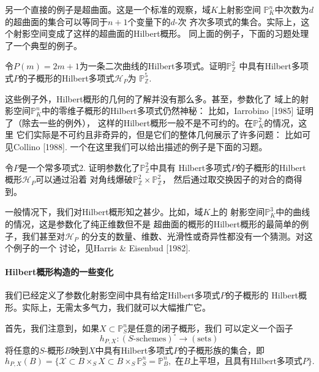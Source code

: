 另一个直接的例子是超曲面。这是一个标准的观察，域$K$上射影空间
$\mathbb P_K^n$中次数为$d$的超曲面的集合可以等同于$n+1$个变量下的$d$-次
齐次多项式的集合。实际上，这个射影空间变成了这样的超曲面的Hilbert概形。
同上面的例子，下面的习题处理了一个典型的例子。


\begin{exe}\label{exe:6.24}
令$P(m)=2m+1$为一条二次曲线的Hilbert多项式。证明$\mathbb P_{\mathbb Z}^2$
中具有Hilbert多项式$P$的子概形的Hilbert多项式$\mathscr H_P$为
$\mathbb P_{\mathbb Z}^5$.
\end{exe}

这些例子外，Hilbert概形的几何的了解并没有那么多。甚至，参数化了
域上的射影空间$\mathbb P_K^n$中的零维子概形的Hilbert多项式仍然神秘：
比如，Iarrobino [1985] 证明了（除去一些\naive 的例外），
这样的Hilbert概形一般不是不可约的。在$\mathbb P_K^2$的情况，这里
它们实际是不可约且非奇异的，但是它们的整体几何展示了许多问题：
比如可见Collino [1988]. 一个在这里我们可以给出描述的例子是下面的习题。

\begin{exe}\label{exe:6.25}
令$P$是一个常多项式$2$. 证明参数化了$\mathbb P_{\mathbb Z}^2$中具有
Hilbert多项式$P$的子概形的Hilbert概形$\mathscr H_P$可以通过沿着
对角线爆破$\mathbb P_{\mathbb Z}^2\times \mathbb P_{\mathbb Z}^2$，
然后通过取交换因子的对合的商得到。
\end{exe}

一般情况下，我们对Hilbert概形知之甚少。比如，域$K$上的
射影空间$\mathbb P_K^3$中的曲线的情况，这是参数化了纯正维数但不是
超曲面的概形的Hilbert概形的最简单的例子，我们甚至对$\mathscr H_P$
的分支的数量、维数、光滑性或奇异性都没有一个猜测。对这个例子的一个
讨论，见Harris \& Eisenbud [1982].

\paragraph*{Hilbert概形构造的一些变化}
我们已经定义了参数化射影空间中具有给定Hilbert多项式$P$的子概形的
Hilbert概形。实际上，无需太多气力，我们就可以大幅推广它。

首先，我们注意到，如果$X\subset \mathbb P_S^n$是任意的闭子概形，我们
可以定义一个函子
\[
    h_{P,X}:(\text{$S$-schemes})^\circ \to (\text{sets})    
\]
将任意的$S$-概形$B$映到$X$中具有Hilbert多项式$P$的子概形族的集合，即
\[
    h_{P,X}(B)=\{\mathscr{X} \subset B \times_{S} X \subset B 
    \times_{S} \mathbb{P}_{S}^{n}=\mathbb{P}_{B}^{n}, 
    \text{ 在$B$上平坦，且具有Hilbert多项式$P$}
    \}.
\]


